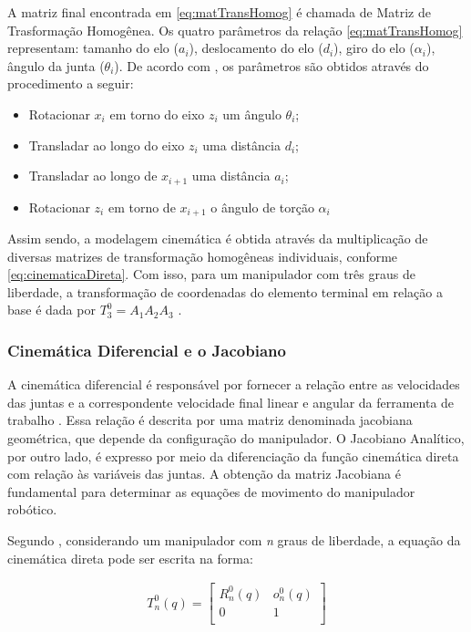 A matriz final encontrada em \eqref{eq:matTransHomog} é chamada de Matriz de
Trasformação Homogênea. Os quatro parâmetros da relação \eqref{eq:matTransHomog} 
representam: tamanho do elo ($a_i$), deslocamento do elo ($d_i$), 
giro do elo ($\alpha_i$), ângulo da junta ($\theta_i$). De acordo com 
, os parâmetros são obtidos através do procedimento a seguir:

\begin{itemize}
  \item Rotacionar $x_i$ em torno do eixo $z_{i}$ um ângulo $\theta_i$;
  \item Transladar ao longo do eixo $z_{i}$ uma distância $d_i$;
  \item Transladar ao longo de $x_{i+1}$ uma distância $a_i$; 
  \item Rotacionar $z_i$ em torno de $x_{i+1}$ o ângulo de torção $\alpha_i$
\end{itemize}

Assim sendo, a modelagem cinemática é obtida através da multiplicação de diversas
matrizes de transformação homogêneas individuais, conforme
\eqref{eq:cinematicaDireta}. Com isso, para um manipulador com três graus de 
liberdade, a transformação de coordenadas do elemento terminal em relação a base é
dada por $T^0_3=A_1A_2A_3$ .

\subsubsection{Cinemática Diferencial e o Jacobiano}

A cinemática diferencial é responsável por fornecer a relação entre as velocidades das juntas
e a correspondente velocidade final linear e angular da ferramenta de trabalho \cite{siciliano}. Essa 
relação é descrita por uma matriz denominada jacobiana geométrica, que depende da configuração do manipulador. 
O Jacobiano Analítico, por outro lado, é expresso por meio da diferenciação da função cinemática direta com 
relação às variáveis das juntas. A obtenção da matriz Jacobiana é fundamental para determinar as equações 
de movimento do manipulador robótico.

Segundo , considerando um manipulador com \textit{n} graus de liberdade, a equação da cinemática direta 
pode ser escrita na forma:

\begin{equation}
  \begin{gathered}
    T^{0}_n(q) = \begin{bmatrix}
     R^{0}_n(q) & o^{0}_n(q)\\
     0 & 1\\
    \end{bmatrix}
  \end{gathered}
  \label{eq:cinematicaDireta_2}
\end{equation}

